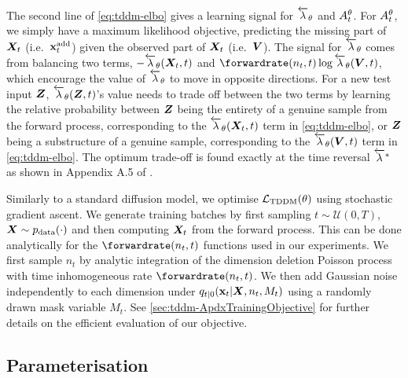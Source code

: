The second line of \cref{eq:tddm-elbo} gives a learning signal for $\overleftarrow{\lambda}_\theta$ and $A_{t}^\theta$.
For $A_{t}^\theta$, we simply have a maximum likelihood objective, predicting the missing part of ${\bm{X}}_t$ (i.e.~${\mathbf{x}}^{\textup{add}}_t$) given the observed part of ${\bm{X}}_t$ (i.e.~${\bm{V}}$).
The signal for $\overleftarrow{\lambda}_\theta$ comes from balancing two terms, $-\overleftarrow{\lambda}_\theta({\bm{X}}_t, t)$ and $\forwardrate(n_t, t) \log \backwardrate_\theta(\mV, t)$, which encourage the value of $\overleftarrow{\lambda}_\theta$ to move in opposite directions. For a new test input ${\bm{Z}}$, $\overleftarrow{\lambda}_\theta({\bm{Z}}, t)$'s value needs to trade off between the two terms by learning the relative probability between ${\bm{Z}}$ being the entirety of a genuine sample from the forward process, corresponding to the $\overleftarrow{\lambda}_\theta({\bm{X}}_t, t)$ term in \cref{eq:tddm-elbo}, or ${\bm{Z}}$ being a substructure of a genuine sample, corresponding to the $\overleftarrow{\lambda}_\theta({\bm{V}}, t)$ term in \cref{eq:tddm-elbo}. The optimum trade-off is found exactly at the time reversal $\overleftarrow{\lambda}^*$ as shown in Appendix A.5 of \citet{campbell2024trans}.

Similarly to a standard diffusion model, we optimise ${\mathcal{L}}_\text{TDDM}(\theta)$ using stochastic gradient ascent. We generate training batches by first sampling $t \sim \mathcal{U}(0, T)$, ${\bm{X}} \sim p_{\rm{data}}(\cdot)$ and then computing ${\bm{X}}_t$ from  the forward process. This can be done analytically for the $\forwardrate(n_t, t)$ functions used in our experiments. We first sample $n_t$ by analytic integration of the dimension deletion Poisson process with time inhomogeneous rate $\forwardrate(n_t, t)$. We then add Gaussian noise independently to each dimension under $q_{t|0}({\mathbf{x}}_t | {\bm{X}}, n_t, M_t)$ using a randomly drawn mask variable $M_t$. See \cref{sec:tddm-ApdxTrainingObjective} for further details on the efficient evaluation of our objective. 

\subsection{Parameterisation}


